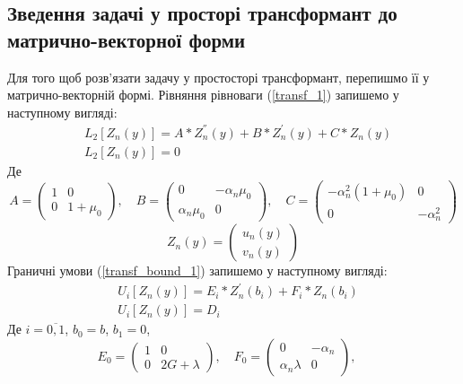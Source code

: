 \documentclass[a4paper,14pt]{extarticle}
\numberwithin{equation}{section}
\begin{document}
\subsection{Зведення задачі у просторі трансформант до матрично-векторної форми}
Для того щоб розв'язати задачу у простосторі трансформант, перепишмо її у матрично-векторній формі.
Рівняння рівноваги (\ref{transf_1}) запишемо у наступному вигляді:
\begin{align}\label{transf_mat_1}
    &L_2\left[ Z_n(y) \right] = A * Z_n^{''}(y) + B * Z_n^{'}(y) + C * Z_n(y) \nonumber \\
    & L_2\left[ Z_n(y) \right] = 0
\end{align}
Де
\begin{equation*}
    A = \begin{pmatrix}
        1 & 0 \\
        0 & 1 + \mu_0
    \end{pmatrix}, \quad
    B = \begin{pmatrix}
        0 & -\alpha_n \mu_0 \\
        \alpha_n \mu_0 & 0
    \end{pmatrix}, \quad
    C = \begin{pmatrix}
        -\alpha_n^2(1 + \mu_0) & 0 \\
        0 & -\alpha_n^2
    \end{pmatrix}
\end{equation*}
\begin{equation*}
    Z_n(y) = \begin{pmatrix}
        u_n(y) \\
        v_n(y)
    \end{pmatrix}
\end{equation*}
Граничні умови (\ref{transf_bound_1}) запишемо у наступному вигляді:
\begin{align}\label{transf_bound_mat_1}
    &U_i\left[ Z_n(y) \right] = E_i * Z_n^{'}(b_i) + F_i * Z_n(b_i) \nonumber \\
    & U_i\left[ Z_n(y) \right] = D_i
\end{align}
Де $i = \overline{0, 1}$, $b_0 = b$, $b_1 = 0$,
\begin{equation*}
    E_0 = \begin{pmatrix}
        1 & 0 \\
        0 & 2G + \lambda
    \end{pmatrix}, \quad
    F_0 = \begin{pmatrix}
        0 & -\alpha_n \\
        \alpha_n \lambda & 0
    \end{pmatrix}, \quad
\end{equation*}
\end{document}

